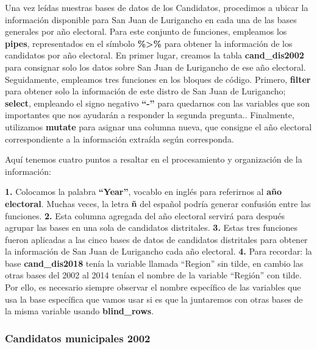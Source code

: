 \documentclass[
]{book}
\begin{document}
Una vez leídas nuestras bases de datos de los Candidatos, procedimos a ubicar la información disponible para San Juan de Lurigancho en cada una de las bases generales por año electoral. Para este conjunto de funciones, empleamos los \textbf{pipes}, representados en el símbolo \textbf{\%\textgreater\%} para obtener la información de los candidatos por año electoral. En primer lugar, creamos la tabla \textbf{cand\_dis2002} para consignar solo los datos sobre San Juan de Lurigancho de ese año electoral. Seguidamente, empleamos tres funciones en los bloques de código. Primero, \textbf{filter} para obtener solo la información de este distro de San Juan de Lurigancho; \textbf{select}, empleando el signo negativo \textbf{``-''} para quedarnos con las variables que son importantes que nos ayudarán a responder la segunda pregunta.. Finalmente, utilizamos \textbf{mutate} para asignar una columna nueva, que consigne el año electoral correspondiente a la información extraída según corresponda.

Aquí tenemos cuatro puntos a resaltar en el procesamiento y organización de la información:

\textbf{1.} Colocamos la palabra \textbf{``Year''}, vocablo en inglés para referirnos al \textbf{año electoral}. Muchas veces, la letra \textbf{ñ} del español podría generar confusión entre las funciones.
\textbf{2.} Esta columna agregada del año electoral servirá para después agrupar las bases en una sola de candidatos distritales.
\textbf{3.} Estas tres funciones fueron aplicadas a las cinco bases de datos de candidatos distritales para obtener la información de San Juan de Lurigancho cada año electoral.
\textbf{4.} Para recordar: la base \textbf{cand\_dis2018} tenía la variable llamada ``Region'' sin tilde, en cambio las otras bases del 2002 al 2014 tenían el nombre de la variable ``Región'' con tilde. Por ello, es necesario siempre observar el nombre específico de las variables que usa la base específica que vamos usar si es que la juntaremos con otras bases de la misma variable usando \textbf{blind\_rows}.

\hypertarget{candidatos-municipales-2002}{%
\subsubsection{Candidatos municipales 2002}\label{candidatos-municipales-2002}}
\end{document}
